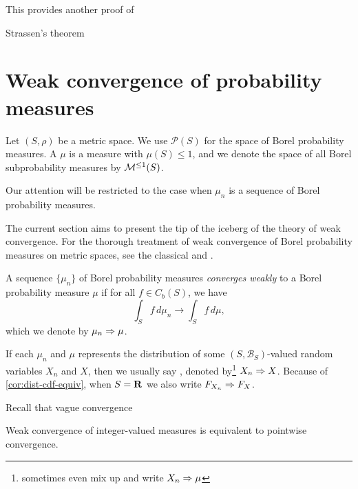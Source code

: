 This provides another proof of 

Strassen's theorem

\section{Weak convergence of probability measures}
Let $(S,\rho)$ be a metric space. We use $\mathcal P(S)$ for the space of Borel probability measures. A  $\mu$ is a measure with $\mu(S) \leq 1$, and we denote the space of all Borel subprobability measures by $\mathcal{M}^{\leq 1}(S)$.

Our attention will be restricted to the case when ${\mu_n}$ is a sequence of Borel probability measures.

The current section aims to present the tip of the iceberg of the theory of weak convergence. For the thorough treatment of weak convergence of Borel probability measures on metric spaces, see the classical \cite{Billingsley_1999} and \cite{Parthasarathy_1967}.

\begin{defn}
    A sequence $\{\mu_n\}$ of Borel probability measures \emph{converges weakly} to a Borel probability measure $\mu$ if for all $f\in C_b(S)$, we have \[
        \int_S f\,d\mu_n \to \int_S f\,d\mu, 
    \]
    which we denote by $\mu_n \Rightarrow \mu$.

    If each $\mu_n$ and $\mu$ represents the distribution of some $(S,\mathcal B_S)$-valued random variables $X_n$ and $X$, then we usually say , denoted by\footnote{sometimes even mix up and write $X_n \Rightarrow \mu$} $X_n \Rightarrow X$. Because of \cref{cor:dist-cdf-equiv}, when $S = \mathbf{R}$ we also write $F_{X_n} \Rightarrow F_{X}$.
\end{defn}

Recall that vague convergence

\begin{prop}
    Weak convergence of integer-valued measures is equivalent to pointwise convergence.
\end{prop}

